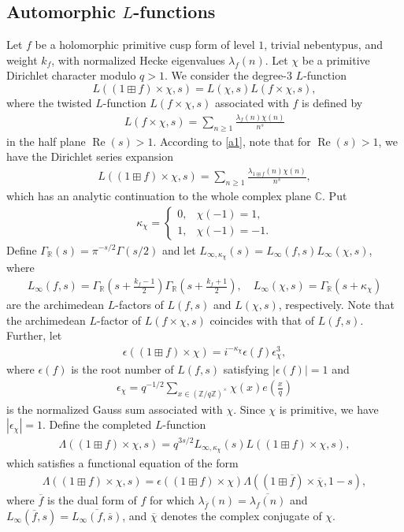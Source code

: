 \documentclass[11pt,reqno]{amsart}
\newcommand{\bea}{\begin{eqnarray}}
\newcommand{\eea}{\end{eqnarray}}
\newcommand{\bna}{\begin{eqnarray*}}
\newcommand{\ena}{\end{eqnarray*}}
\numberwithin{equation}{section}
\theoremstyle{plain}
\theoremstyle{definition}
\renewcommand{\Re}{\operatorname{Re}}
\begin{document}
\subsection{Automorphic $L$-functions}
Let $f$ be a holomorphic primitive cusp form of level $1$,
trivial nebentypus, and weight $k_f$, with normalized Hecke
eigenvalues $\lambda_f(n)$. Let $\chi$ be a primitive Dirichlet
character modulo $q>1$. We consider the degree-$3$ $L$-function
\[
L((1\boxplus f)\times\chi,s)
=
L(\chi,s)L(f\times\chi,s),
\]
where the twisted $L$-function $L(f\times \chi, s)$ associated with $f$ is defined by
\bna
L(f\times \chi, s)=\sum_{n\geq 1}\frac{\lambda_{f}(n)\chi(n)}{n^s}
\ena
in the half plane $\Re(s)>1$.
According to \eqref{a1},
note that for $\Re(s)>1$, we have the Dirichlet series expansion
\bna
L((1\boxplus f)\times \chi, s)
=\sum_{n\geq 1}\frac{\lambda_{1\boxplus f}(n)\chi(n)}{n^s},
\ena
which has an analytic continuation to the whole complex plane $\mathbb{C}$.
Put
\bna
\kappa_\chi=
\begin{cases}
0, & \chi(-1)=1,\\
1, & \chi(-1)=-1.
\end{cases}
\ena
Define
$\Gamma_{\mathbb{R}}(s)=\pi^{-s/2}\Gamma(s/2)$ and let
$L_{\infty,\kappa_\chi}(s)=L_\infty(f,s)L_\infty(\chi,s)$, where
\bna
L_\infty(f,s)=\Gamma_{\mathbb{R}}\left(s+\frac{k_f-1}{2}\right)
\Gamma_{\mathbb{R}}\left(s+\frac{k_f+1}{2}\right),\quad
L_\infty(\chi,s)=\Gamma_{\mathbb{R}}(s+\kappa_\chi)
\ena
are the archimedean $L$-factors of $L(f,s)$ and
$L(\chi,s)$, respectively. Note that the archimedean
$L$-factor of $L(f\times\chi,s)$ coincides with that of $L(f,s)$.
Further, let 
\bna
\epsilon((1\boxplus f)\times \chi)
=i^{-\kappa_\chi}\epsilon(f)\epsilon_{\chi}^3,
\ena
where $\epsilon(f)$ is the root number of $L(f,s)$ satisfying
$|\epsilon(f)|=1$ and
\bna
\epsilon_{\chi}=q^{-1/2}\sum_{x\in (\mathbb{Z}/q\mathbb{Z})^{\times}}
\chi(x)e\left(\frac{x}{q}\right)
\ena
is the normalized Gauss sum associated with $\chi$.
Since $\chi$ is primitive, we have $|\epsilon_\chi|=1$.
Define the completed $L$-function
\bna
\Lambda((1\boxplus f)\times \chi, s)
=q^{3s/2}L_{\infty,\kappa_\chi}(s)L((1\boxplus f)\times \chi, s),
\ena
which satisfies a functional equation of the form
\bea\label{FE}
\Lambda((1\boxplus f)\times \chi, s)
=\epsilon((1\boxplus f)\times \chi)
\Lambda((1\boxplus \overline{f})\times \overline{\chi}, 1-s),
\eea
where $\overline{f}$ is the dual form of $f$ for which
$\lambda_{\overline{f}}(n)=\overline{\lambda_f(n)}$ and
$L_\infty(\overline{f},s)=\overline{L_\infty(f,\overline{s})}$,
and $\overline{\chi}$ denotes the complex conjugate of $\chi$.
\end{document}
